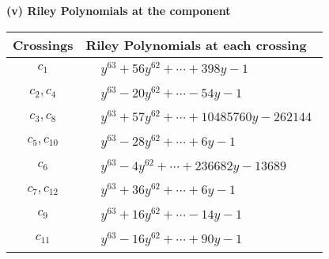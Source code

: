 \documentclass[1p]{elsarticle_modified}
\theoremstyle{definition}
\begin{document}
\newpage\renewcommand{\arraystretch}{1}
\flushleft \textbf{(v) Riley Polynomials at the component}\newline \\
\begin{tabular}{m{50pt}|m{274pt}}
Crossings & \hspace{64pt}Riley Polynomials at each crossing \\
\hline $$\begin{aligned}c_{1}\end{aligned}$$&$\begin{aligned}
&y^{63}+56 y^{62}+\cdots+398 y-1
\end{aligned}$\\
\hline $$\begin{aligned}c_{2},c_{4}\end{aligned}$$&$\begin{aligned}
&y^{63}-20 y^{62}+\cdots-54 y-1
\end{aligned}$\\
\hline $$\begin{aligned}c_{3},c_{8}\end{aligned}$$&$\begin{aligned}
&y^{63}+57 y^{62}+\cdots+10485760 y-262144
\end{aligned}$\\
\hline $$\begin{aligned}c_{5},c_{10}\end{aligned}$$&$\begin{aligned}
&y^{63}-28 y^{62}+\cdots+6 y-1
\end{aligned}$\\
\hline $$\begin{aligned}c_{6}\end{aligned}$$&$\begin{aligned}
&y^{63}-4 y^{62}+\cdots+236682 y-13689
\end{aligned}$\\
\hline $$\begin{aligned}c_{7},c_{12}\end{aligned}$$&$\begin{aligned}
&y^{63}+36 y^{62}+\cdots+6 y-1
\end{aligned}$\\
\hline $$\begin{aligned}c_{9}\end{aligned}$$&$\begin{aligned}
&y^{63}+16 y^{62}+\cdots-14 y-1
\end{aligned}$\\
\hline $$\begin{aligned}c_{11}\end{aligned}$$&$\begin{aligned}
&y^{63}-16 y^{62}+\cdots+90 y-1
\end{aligned}$\\
\hline
\end{tabular}\\~\\
\end{document}
